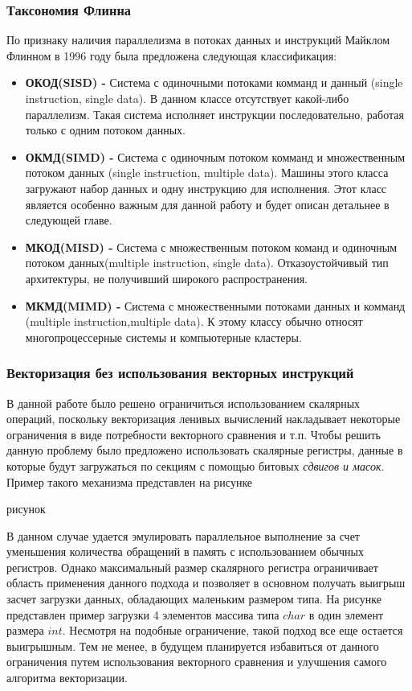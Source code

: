 \subsubsection{Таксономия Флинна}
По признаку наличия параллелизма в потоках данных и инструкций Майклом Флинном в 1996 году была предложена следующая классификация: %
\begin{itemize}
  \item \textbf{ОКОД(SISD) - } Система с одиночными потоками комманд и данный (single instruction, single data). В данном классе отсутствует какой-либо параллелизм. Такая система исполняет инструкции последовательно, работая только с одним потоком данных.
  
  
  \item \textbf{ОКМД(SIMD) - } Система с одиночным потоком комманд и множественным потоком данных (single instruction, multiple data). Машины этого класса загружают набор данных и одну инструкцию для исполнения. Этот класс является особенно важным для данной работу и будет описан детальнее в следующей главе.
  
  \item  \textbf{МКОД(MISD) -} Система с множественным потоком команд и одиночным потоком данных(multiple instruction, single data). Отказоустойчивый тип архитектуры, не получивший широкого распространения.
  
  \item  \textbf{МКМД(MIMD) -} Система с множественными потоками данных и комманд (multiple instruction,multiple data). К этому классу обычно относят многопроцессерные системы и компьютерные кластеры. 
\end{itemize}

\subsubsection{Векторизация без использования векторных инструкций}


В данной работе было решено ограничиться использованием скалярных операций, поскольку векторизация ленивых вычислений накладывает некоторые ограничения в виде потребности векторного сравнения и т.п. Чтобы решить данную проблему было предложено использовать скалярные регистры, данные в которые будут загружаться по секциям с помощью битовых \textit{сдвигов и масок}. Пример такого механизма представлен на рисунке \todo[рисунок]

рисунок

В данном случае удается эмулировать параллельное выполнение за счет уменьшения количества обращений в память с использованием обычных регистров. Однако максимальный размер скалярного регистра ограничивает область применения данного подхода и позволяет в основном получать выигрыш засчет загрузки данных, обладающих маленьким размером типа. На рисунке \todo[рисунок] представлен пример загрузки 4 элементов массива типа $char$ в один элемент размера $int$. Несмотря на подобные ограничение, такой подход все еще остается выигрышным. Тем не менее, в будущем планируется избавиться от данного ограничения путем использования векторного сравнения и улучшения самого алгоритма векторизации.  
\newpage
